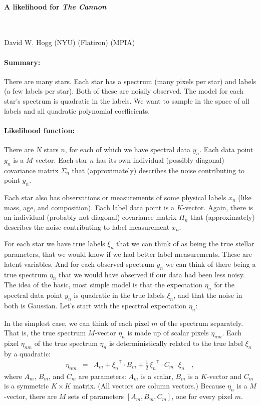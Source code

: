 \documentclass[12pt, letterpaper]{article}
\newcommand{\transpose}[1]{{#1}^{\!{\mathsf{T}}}}
\begin{document}
\paragraph{A likelihood for \textsl{The Cannon}}
~

\noindent
David W. Hogg (NYU) (Flatiron) (MPIA)

\paragraph{Summary:}
There are many stars. Each star has a spectrum (many pixels per star)
and labels (a few labels per star). Both of these are noisily
observed. The model for each star's spectrum is quadratic in the
labels. We want to sample in the space of all labels and all quadratic
polynomial coefficients.

\paragraph{Likelihood function:}
There are $N$ stars $n$, for each of which we have spectral data $y_n$.
Each data point $y_n$ is a $M$-vector.
Each star $n$ has its own individual (possibly diagonal) covariance
matrix $\Sigma_n$ that (approximately) describes the noise
contributing to point $y_n$.

Each star also has observations or measurements of some physical labels
$x_n$ (like mass, age, and composition).
Each label data point is a $K$-vector.
Again, there is an individual (probably not diagonal) covariance
matrix $\Pi_n$ that (approximately) describes the noise contributing to
label measurement $x_n$.

For each star we have true labels $\xi_n$ that we can think of as
being the true stellar parameters, that we would know if we had better
label measurements. These are latent variables.
And for each observed spectrum $y_n$ we can think of there being a
true spectrum $\eta_n$ that we would have observed if our data had
been less noisy.
The idea of the basic, most simple model is that the expectation $\eta_n$ for
the spectral data point $y_n$ is quadratic in the true labels $\xi_n$,
and that the noise in both is Gaussian. Let's start with the specrtral
expectation $\eta_n$:

In the simplest case, we can think of each pixel $m$ of the spectrum
separately.
That is, the true spectrum $M$-vector $\eta_n$ is made up of scalar
pixels $\eta_{nm}$.
Each pixel $\eta_{nm}$ of the true spectrum $\eta_n$ is
deterministically related to the true label $\xi_n$ by a quadratic:
\begin{eqnarray}
  \eta_{nm} &=& A_m + \transpose{\xi_n}\cdot B_m
  + \frac{1}{2}\,\transpose{\xi_n}\cdot C_m\cdot\xi_n
\quad ,
\end{eqnarray}
where $A_m$, $B_m$, and $C_m$ are parameters: $A_m$ is a scalar, $B_m$
is a $K$-vector and $C_m$ is a symmetric $K\times K$ matrix.
(All vectors are column vectors.)
Because $\eta_n$ is a $M$-vector, there are $M$ sets of parameters
$[A_m, B_m, C_m]$, one for every pixel $m$.
\end{document}

